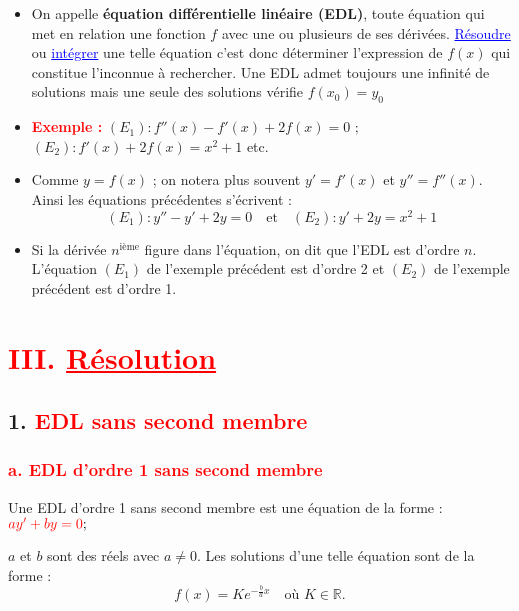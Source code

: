 \documentclass[a4paper,12pt]{article}
\begin{document}
\begin{itemize}
    \item On appelle \textbf{équation différentielle linéaire (EDL)}, toute équation qui met en relation une fonction $f$ avec une ou plusieurs de ses dérivées. \textcolor{blue}{\underline{Résoudre}} ou \textcolor{blue}{\underline{intégrer}} une telle équation c’est donc déterminer l’expression de $f(x)$ qui constitue l’inconnue à rechercher. Une EDL admet toujours une infinité de solutions mais une seule des solutions vérifie $f(x_0)=y_0$
    
    \item \textbf{\textcolor{red}{Exemple :}} $(E_1) : f''(x) - f'(x) + 2f(x) = 0$ ; $(E_2) : f'(x) + 2f(x) = x^2 + 1$ etc.
    
    \item Comme $y = f(x)$ ; on notera plus souvent $y' = f'(x)$ et $y'' = f''(x)$.\\
    Ainsi les équations précédentes s’écrivent : 
    \[
        (E_1) : y'' - y' + 2y = 0 \quad \text{et} \quad (E_2) : y' + 2y = x^2 + 1
    \]
    
    \item Si la dérivée $n^{\text{ième}}$ figure dans l’équation, on dit que l’EDL est d’ordre $n$.\\
    L’équation $(E_1)$ de l’exemple précédent est d’ordre 2 et $(E_2)$ de l’exemple précédent est d’ordre 1.
\end{itemize}

\section*{\textcolor{red}{III. \underline{Résolution}}}
\subsection*{1. \textcolor{red}{EDL sans second membre}}

\subsubsection*{\textcolor{red}{a. EDL d’ordre 1 sans second membre}}
Une EDL d’ordre 1 sans second membre est une équation de la forme : \(\textcolor{red}{ay' + by = 0} ;\)

$a$ et $b$ sont des réels avec $a \neq 0$. Les solutions d’une telle équation sont de la forme : 
\[
\boxed{f(x) = Ke^{-\frac{b}{a}x}} \quad \text{où } K \in \mathbb{R}.
\]
\end{document}
